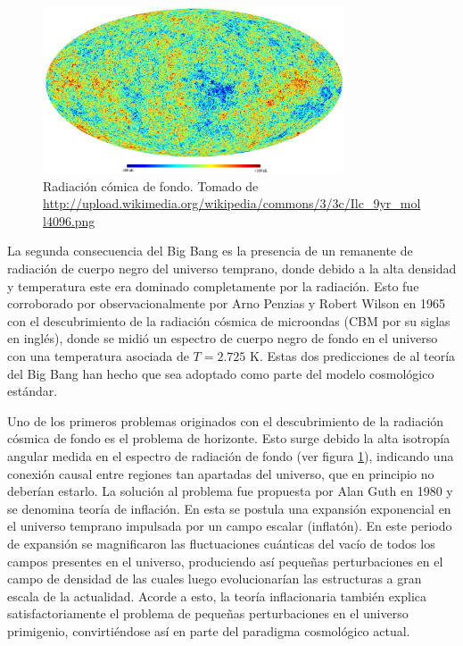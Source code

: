 \
\begin{figure}[htbp]
	\centering
	\includegraphics[width=0.8\textwidth]
	{./figures/1_introduction/CMB.png}
	
	\caption{\small{Radiación cómica de fondo. Tomado de 
	\url{http://upload.wikimedia.org/wikipedia/commons/3/3c/Ilc_9yr_moll4096.png}}}
	
	\label{fig:CMB}
\end{figure}


La segunda consecuencia del Big Bang es la presencia de un remanente de 
radiación de cuerpo negro del universo temprano, donde debido a la alta 
densidad y temperatura este era dominado completamente por la radiación.
Esto fue corroborado por observacionalmente por Arno Penzias y Robert
Wilson en 1965 con el descubrimiento de la radiación cósmica de microondas
(CBM por su siglas en inglés), donde se midió un espectro de cuerpo negro
de fondo en el universo con una temperatura asociada de $T = 2.725$ K. 
Estas dos predicciones de al teoría del Big Bang han hecho que sea 
adoptado como parte del modelo cosmológico estándar.


Uno de los primeros problemas originados con el descubrimiento de la 
radiación cósmica de fondo es el problema de horizonte. Esto surge debido
la alta isotropía angular medida en el espectro de radiación de fondo (ver 
figura \ref{fig:CMB}), indicando una conexión causal entre regiones tan 
apartadas del universo, que en principio no deberían estarlo. La solución 
al problema fue propuesta por Alan Guth en 1980 y se denomina teoría de 
inflación. En esta se postula una expansión exponencial en el universo 
temprano impulsada por un campo escalar (inflatón). En este periodo de 
expansión se magnificaron las fluctuaciones cuánticas del vacío de todos 
los campos presentes en el universo, produciendo así pequeñas perturbaciones 
en el campo de densidad de las cuales luego evolucionarían las estructuras 
a gran escala de la actualidad. Acorde a esto, la teoría inflacionaria 
también explica satisfactoriamente el problema de pequeñas perturbaciones 
en el universo primigenio, convirtiéndose así en parte del paradigma 
cosmológico actual.



